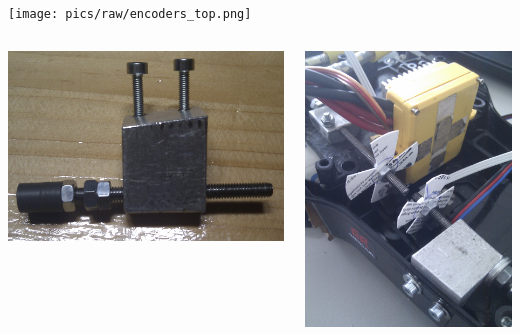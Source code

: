 \documentclass[pdf]{beamer}
\begin{document}
\begin{frame}
  \begin{center}
  \texttt{[image: pics/raw/encoders\_top.png]}
  \end{center}
\end{frame}
\begin{frame}
  \begin{columns}
  \begin{center}
  \includegraphics[width = \textwidth]{pics/raw/encoder_mount.png}
  \end{center}
  \begin{center}
  \includegraphics[width = \textwidth]{pics/raw/encoders_scheiben.jpg}
  \end{center}
  \end{columns}
\end{frame}
\end{document}
